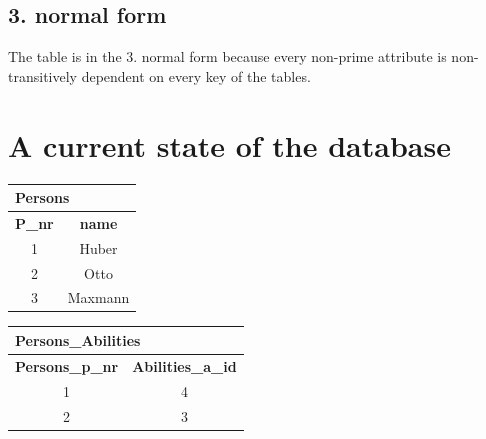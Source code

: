\documentclass[12pt,a4paper,ngerman]{article}
\begin{document}
\subsection{3. normal form}
The table is in the 3. normal form because every non-prime attribute is non-transitively dependent on every key of the tables.

\section{A current state of the database}
                        
\begin{table}[h]
	\centering
	\begin{minipage}{0.3\textwidth}
		\begin{tabular}{| c | c |}
			\hline
			\multicolumn{2}{|l|}{\textbf{Persons}} \\ \hline
			\textbf{P\_nr} & \textbf{name} \\ \hline \hline
			1 & Huber											\\ \hline
			2 & Otto											\\ \hline
			3 & Maxmann											\\ \hline
		\end{tabular}
	\end{minipage}\hfill
	\begin{minipage}{0.6\textwidth}
		\begin{tabular}{| c | c |}  
			\hline
			\multicolumn{2}{|l|}{\textbf{Persons\_Abilities}} \\ \hline
			\textbf{Persons\_p\_nr} & \textbf{Abilities\_a\_id}               \\ \hline \hline
			1 & 4											\\ \hline
			2 & 3											\\ \hline
		\end{tabular}
	\end{minipage}
\end{table}
\end{document}
